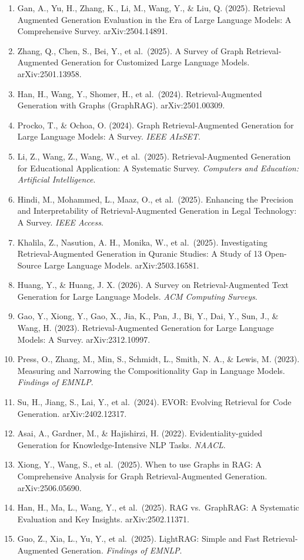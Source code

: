 \begin{enumerate}
  Aghajani Asl, M., Asgari-Bidhendi, M., \& Minaei-Bidgoli, B. (2025). FAIR-RAG: Faithful Adaptive Iterative Refinement for Retrieval-Augmented Generation. arXiv:2510.22344.
\item
  Gan, A., Yu, H., Zhang, K., Li, M., Wang, Y., \& Liu, Q. (2025). Retrieval Augmented Generation Evaluation in the Era of Large Language Models: A Comprehensive Survey. arXiv:2504.14891.
\item
  Zhang, Q., Chen, S., Bei, Y., et al.~(2025). A Survey of Graph Retrieval-Augmented Generation for Customized Large Language Models. arXiv:2501.13958.
\item
  Han, H., Wang, Y., Shomer, H., et al.~(2024). Retrieval-Augmented Generation with Graphs (GraphRAG). arXiv:2501.00309.
\item
  Procko, T., \& Ochoa, O. (2024). Graph Retrieval-Augmented Generation for Large Language Models: A Survey. \emph{IEEE AIxSET}.
\item
  Li, Z., Wang, Z., Wang, W., et al.~(2025). Retrieval-Augmented Generation for Educational Application: A Systematic Survey. \emph{Computers and Education: Artificial Intelligence}.
\item
  Hindi, M., Mohammed, L., Maaz, O., et al.~(2025). Enhancing the Precision and Interpretability of Retrieval-Augmented Generation in Legal Technology: A Survey. \emph{IEEE Access}.
\item
  Khalila, Z., Nasution, A. H., Monika, W., et al.~(2025). Investigating Retrieval-Augmented Generation in Quranic Studies: A Study of 13 Open-Source Large Language Models. arXiv:2503.16581.
\item
  Huang, Y., \& Huang, J. X. (2026). A Survey on Retrieval-Augmented Text Generation for Large Language Models. \emph{ACM Computing Surveys}.
\item
  Gao, Y., Xiong, Y., Gao, X., Jia, K., Pan, J., Bi, Y., Dai, Y., Sun, J., \& Wang, H. (2023). Retrieval-Augmented Generation for Large Language Models: A Survey. arXiv:2312.10997.
\item
  Press, O., Zhang, M., Min, S., Schmidt, L., Smith, N. A., \& Lewis, M. (2023). Measuring and Narrowing the Compositionality Gap in Language Models. \emph{Findings of EMNLP}.
\item
  Su, H., Jiang, S., Lai, Y., et al.~(2024). EVOR: Evolving Retrieval for Code Generation. arXiv:2402.12317.
\item
  Asai, A., Gardner, M., \& Hajishirzi, H. (2022). Evidentiality-guided Generation for Knowledge-Intensive NLP Tasks. \emph{NAACL}.
\item
  Xiong, Y., Wang, S., et al.~(2025). When to use Graphs in RAG: A Comprehensive Analysis for Graph Retrieval-Augmented Generation. arXiv:2506.05690.
\item
  Han, H., Ma, L., Wang, Y., et al.~(2025). RAG vs.~GraphRAG: A Systematic Evaluation and Key Insights. arXiv:2502.11371.
\item
  Guo, Z., Xia, L., Yu, Y., et al.~(2025). LightRAG: Simple and Fast Retrieval-Augmented Generation. \emph{Findings of EMNLP}.
\end{enumerate}
